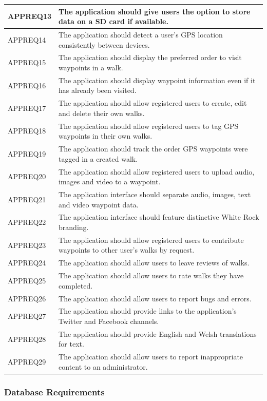 \documentclass[11pt,a4paper]{article}
\begin{document}
\begin{longtable}{|p{2.5cm}p{13cm}|}
APPREQ13 & The application should give users the option to store data on a SD card if available. \\ \hline
APPREQ14 & The application should detect a user's GPS location consistently between devices. \\ \hline
APPREQ15 & The application should display the preferred order to visit waypoints in a walk. \\ \hline
APPREQ16 & The application should display waypoint information even if it has already been visited. \\ \hline
APPREQ17 & The application should allow registered users to create, edit and delete their own walks. \\ \hline
APPREQ18 & The application should allow registered users to tag GPS waypoints in their own walks. \\ \hline
APPREQ19 & The application should track the order GPS waypoints were tagged in a created walk. \\ \hline
APPREQ20 & The application should allow registered users to upload audio, images and video to a waypoint. \\ \hline
APPREQ21 & The application interface should separate audio, images, text and video waypoint data. \\ \hline
APPREQ22 & The application interface should feature distinctive White Rock branding. \\ \hline
APPREQ23 & The application should allow registered users to contribute waypoints to other user's walks by request. \\ \hline
APPREQ24 & The application should allow users to leave reviews of walks. \\ \hline
APPREQ25 & The application should allow users to rate walks they have completed. \\ \hline
APPREQ26 & The application should allow users to report bugs and errors. \\ \hline
APPREQ27 & The application should provide links to the application's Twitter and Facebook channels. \\ \hline
APPREQ28 & The application should provide English and Welsh translations for text. \\ \hline
APPREQ29 & The application should allow users to report inappropriate content to an administrator. \\ \hline
\end{longtable}

\subsubsection{Database Requirements}
\label{sec:db-reqs}
\end{document}
